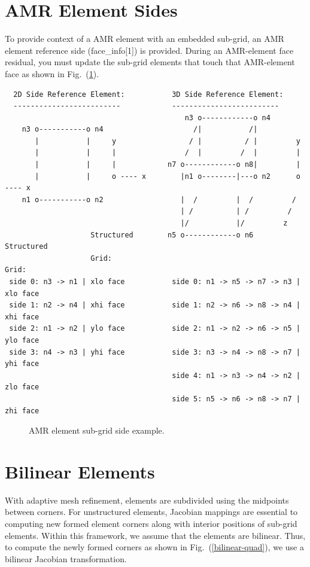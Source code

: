 \documentclass[11pt]{book}
\begin{document}
\begin{appendices}
\section{AMR Element Sides}\label{appendix:AMR-ref-sides}
To provide context of a AMR element with an embedded sub-grid, an AMR element reference side (face\_info[1])  is provided. 
During an AMR-element face residual, you must update the sub-grid elements that touch that AMR-element face as shown in Fig.~(\ref{Subgrid-array}).
\begin{verbatim}
  2D Side Reference Element:           3D Side Reference Element:
  -------------------------            -------------------------
                                          n3 o------------o n4
    n3 o-----------o n4                     /|           /|    
       |           |     y                 / |          / |         y
       |           |     |                /  |         /  |         |
       |           |     |            n7 o------------o n8|         |
       |           |     o ---- x        |n1 o--------|---o n2      o ---- x
    n1 o-----------o n2                  |  /         |  /         /
                                         | /          | /         /
                                         |/           |/         z
                    Structured        n5 o------------o n6            Structured
                    Grid:                                             Grid:
 side 0: n3 -> n1 | xlo face           side 0: n1 -> n5 -> n7 -> n3 | xlo face
 side 1: n2 -> n4 | xhi face           side 1: n2 -> n6 -> n8 -> n4 | xhi face
 side 2: n1 -> n2 | ylo face           side 2: n1 -> n2 -> n6 -> n5 | ylo face
 side 3: n4 -> n3 | yhi face           side 3: n3 -> n4 -> n8 -> n7 | yhi face
                                       side 4: n1 -> n3 -> n4 -> n2 | zlo face
                                       side 5: n5 -> n6 -> n8 -> n7 | zhi face
\end{verbatim}

\begin{figure}[h]
 \begin{subfigmatrix}{2}%
 \end{subfigmatrix}
 \caption{AMR element sub-grid side example.}
 \label{Subgrid-array}
\end{figure}


\newpage
\section{Bilinear Elements}
With adaptive mesh refinement, elements are subdivided using the midpoints between corners.
For unstructured elements, Jacobian mappings are essential to computing new formed element corners along with interior positions of sub-grid elements.
Within this framework, we assume that the elements are bilinear. Thus, to compute the newly formed corners as shown in Fig.~(\ref{bilinear-quad}), we use a bilinear Jacobian transformation.


\end{appendices}
\end{document}
